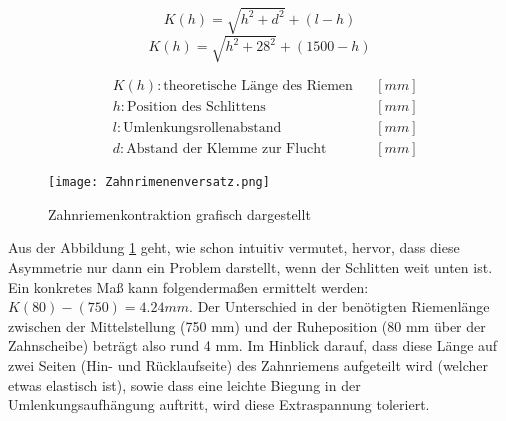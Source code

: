     \noindent\begin{minipage}{\textwidth}
    \begin{minipage}[t]{0.5\textwidth}
        \begin{equation*}
            K(h) = \sqrt{h^2+d^2}+(l-h)
        \end{equation*}
        \begin{equation*}
            K(h) = \sqrt{h^2+28^2}+(1500-h)
        \end{equation*}
    \end{minipage}%
    \begin{minipage}[t]{0.5\textwidth}
        \vspace{-7mm}
        \begin{align*}
            &K(h): \text{theoretische Länge des Riemen} & &\left[mm\right]\\
            &h: \text{Position des Schlittens} & &\left[mm\right]\\
            &l: \text{Umlenkungsrollenabstand} & &\left[mm\right]\\
            &d: \text{Abstand der Klemme zur Flucht} & &\left[mm\right]
        \end{align*}
    \end{minipage}
    \end{minipage}

    \begin{figure}[H]
        \centering
        \texttt{[image: Zahnrimenenversatz.png]}
        \caption{Zahnriemenkontraktion grafisch dargestellt}
        \label{zahnriemenversatz}
    \end{figure}

    Aus der Abbildung \ref{zahnriemenversatz} geht, wie schon intuitiv vermutet, hervor, dass diese Asymmetrie nur dann ein Problem darstellt, wenn der Schlitten weit unten ist. Ein konkretes Maß kann folgendermaßen ermittelt werden: \(K(80) - (750) = 4.24 \unit{mm}\). Der Unterschied in der benötigten Riemenlänge zwischen der Mittelstellung (750 mm) und der Ruheposition (80 mm über der Zahnscheibe) beträgt also rund 4 mm. Im Hinblick darauf, dass diese Länge auf zwei Seiten (Hin- und Rücklaufseite) des Zahnriemens aufgeteilt wird (welcher etwas elastisch ist), sowie dass eine leichte Biegung in der Umlenkungsaufhängung auftritt, wird diese Extraspannung toleriert.

